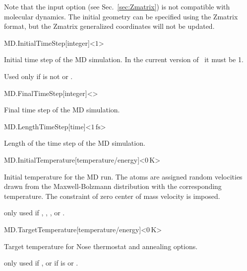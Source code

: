 Note that the  input option (see Sec.~\ref{sec:Zmatrix}) is not
compatible with molecular dynamics. The initial geometry can be
specified using the Zmatrix format, but the Zmatrix generalized
coordinates will not be updated.


\begin{fdfentry}{MD.InitialTimeStep}[integer]<$1$>
  
  Initial time step of the MD simulation.  In the current version of
  \siesta\ it must be 1.

  Used only if  is not  or .

\end{fdfentry}

\begin{fdfentry}{MD.FinalTimeStep}[integer]<>

  Final time step of the MD simulation.

\end{fdfentry}


\begin{fdfentry}{MD.LengthTimeStep}[time]<$1\,\mathrm{fs}$>

  Length of the time step of the MD simulation.

\end{fdfentry}

\begin{fdfentry}{MD.InitialTemperature}[temperature/energy]<$0\,\mathrm K$>
  
  Initial temperature for the MD run. The atoms are assigned random
  velocities drawn from the Maxwell-Bolzmann distribution with the
  corresponding temperature. The constraint of zero center of mass
  velocity is imposed.

  \note only used if  , ,
  ,  or
  . 

\end{fdfentry}

\begin{fdfentry}{MD.TargetTemperature}[temperature/energy]<$0\,\mathrm K$>

  Target temperature for Nose thermostat and annealing options.

  \note only used if  ,
   or
   if  is  or
  .

\end{fdfentry}

